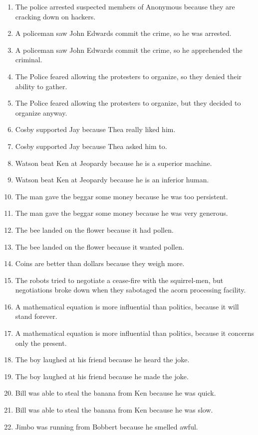 \documentclass{article}
\begin{document}
\begin{enumerate}
	\item The police arrested suspected members of Anonymous because they are cracking down on hackers.
	\item A policeman saw John Edwards commit the crime, so he was arrested.
	\item A policeman saw John Edwards commit the crime, so he apprehended the criminal.
	\item The Police feared allowing the protesters to organize, so they denied their ability to gather.
	\item The Police feared allowing the protesters to organize, but they decided to organize anyway.
	\item Cosby supported Jay because Thea really liked him.
	\item Cosby supported Jay because Thea asked him to.
	\item Watson beat Ken at Jeopardy because he is a superior machine.
	\item Watson beat Ken at Jeopardy because he is an inferior human.
	\item The man gave the beggar some money because he was too persistent.
	\item The man gave the beggar some money because he was very generous.
	\item The bee landed on the flower because it had pollen.
	\item The bee landed on the flower because it wanted pollen.
	\item Coins are better than dollars because they weigh more.
	\item The robots tried to negotiate a cease-fire with the squirrel-men, but negotiations broke down when they sabotaged the acorn processing facility.
	\item A mathematical equation is more influential than politics, because it will stand forever.
	\item A mathematical equation is more influential than politics, because it concerns only the present.
	\item The boy laughed at his friend because he heard the joke.
	\item The boy laughed at his friend because he made the joke.
	\item Bill was able to steal the banana from Ken because he was quick.
	\item Bill was able to steal the banana from Ken because he was slow.
	\item Jimbo was running from Bobbert because he smelled awful.

\end{enumerate}
\end{document}
